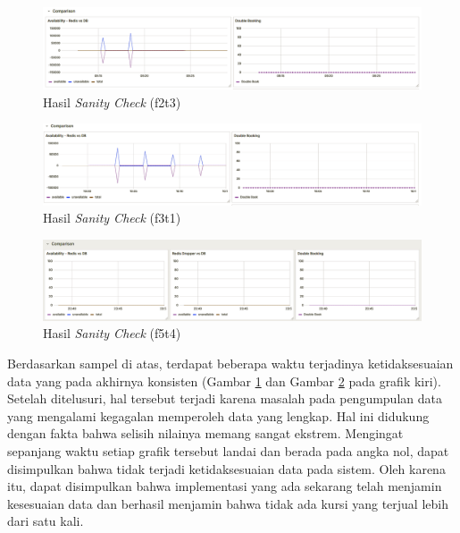 \begin{figure}[H]
    \centering
    \includegraphics[width=1\textwidth]{resources/chapter-4/sanity-f2t3.png}
    \caption{Hasil \textit{Sanity Check} (f2t3)}
    \label{fig:sanity-f2t3}
\end{figure}

\begin{figure}[H]
    \centering
    \includegraphics[width=1\textwidth]{resources/chapter-4/sanity-f3t1.png}
    \caption{Hasil \textit{Sanity Check} (f3t1)}
    \label{fig:sanity-f3t1}
\end{figure}

\begin{figure}[H]
    \centering
    \includegraphics[width=1\textwidth]{resources/chapter-4/sanity-f5t4.png}
    \caption{Hasil \textit{Sanity Check} (f5t4)}
    \label{fig:sanity-f5t4}
\end{figure}

Berdasarkan sampel di atas, terdapat beberapa waktu terjadinya ketidaksesuaian data yang pada akhirnya konsisten (Gambar \ref{fig:sanity-f2t3} dan Gambar \ref{fig:sanity-f3t1} pada grafik kiri). Setelah ditelusuri, hal tersebut terjadi karena masalah pada pengumpulan data yang mengalami kegagalan memperoleh data yang lengkap. Hal ini didukung dengan fakta bahwa selisih nilainya memang sangat ekstrem. Mengingat sepanjang waktu setiap grafik tersebut landai dan berada pada angka nol, dapat disimpulkan bahwa tidak terjadi ketidaksesuaian data pada sistem. Oleh karena itu, dapat disimpulkan bahwa implementasi yang ada sekarang telah menjamin kesesuaian data dan berhasil menjamin bahwa tidak ada kursi yang terjual lebih dari satu kali.
